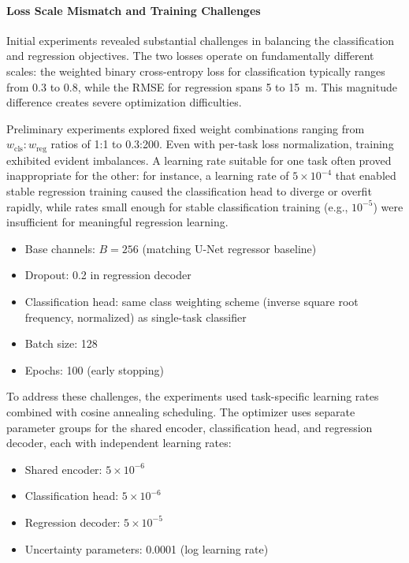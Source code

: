 \paragraph{Loss Scale Mismatch and Training Challenges}

Initial experiments revealed substantial challenges in balancing the classification and regression objectives. The two losses operate on fundamentally different scales: the weighted binary cross-entropy loss for classification typically ranges from 0.3 to 0.8, while the RMSE for regression spans 5 to 15~m. This magnitude difference creates severe optimization difficulties.

Preliminary experiments explored fixed weight combinations ranging from $w_{\text{cls}}:w_{\text{reg}}$ ratios of 1:1 to 0.3:200. Even with per-task loss normalization, training exhibited evident imbalances. A learning rate suitable for one task often proved inappropriate for the other: for instance, a learning rate of $5\times 10^{-4}$ that enabled stable regression training caused the classification head to diverge or overfit rapidly, while rates small enough for stable classification training (e.g., $10^{-5}$) were insufficient for meaningful regression learning.

\begin{itemize}
    \item Base channels: $B = 256$ (matching U-Net regressor baseline)
    \item Dropout: 0.2 in regression decoder
    \item Classification head: same class weighting scheme (inverse square root frequency, normalized) as single-task classifier
    \item Batch size: 128
    \item Epochs: 100 (early stopping)
\end{itemize}

To address these challenges, the experiments used task-specific learning rates combined with cosine annealing scheduling. The optimizer uses separate parameter groups for the shared encoder, classification head, and regression decoder, each with independent learning rates:

\begin{itemize}
    \item Shared encoder: $5\times 10^{-6}$
    \item Classification head: $5\times 10^{-6}$
    \item Regression decoder: $5\times 10^{-5}$
    \item Uncertainty parameters: 0.0001 (log learning rate)
\end{itemize}

